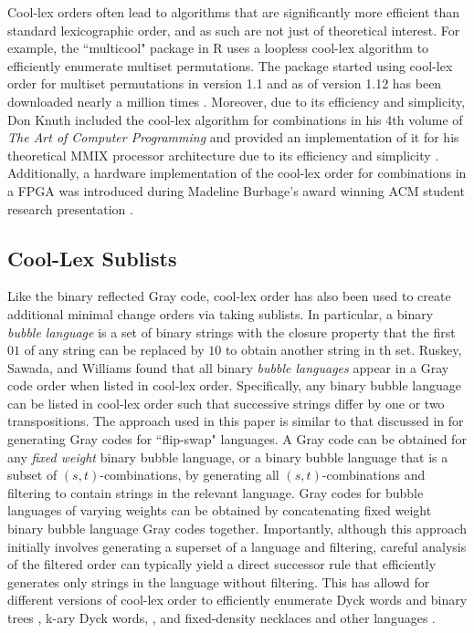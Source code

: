 Cool-lex orders often lead to algorithms that are significantly more efficient than standard lexicographic order, and as such are not just of theoretical interest.  For example, the ``multicool" package in R uses a loopless cool-lex algorithm to efficiently enumerate multiset permutations.   The package started using cool-lex order for multiset permutations in version 1.1 and as of version 1.12 has been downloaded nearly a million times \cite{multicool_2021}.  Moreover, due to its efficiency and simplicity, Don Knuth included the cool-lex algorithm for combinations in his 4th volume of \emph{The Art of Computer Programming} and provided an implementation of it for his theoretical MMIX processor architecture due to its efficiency and simplicity \cite{knuth2015art}.  Additionally, a hardware implementation of the cool-lex order for combinations in a FPGA was introduced during Madeline Burbage's award winning ACM student research presentation \cite{burbage2020cool}.





\subsection{Cool-Lex Sublists}

Like the binary reflected Gray code, cool-lex order has also been used to create additional minimal change orders via taking sublists. In particular, a binary \emph{bubble language} is a set of binary strings with the closure property that the first $01$ of any string can be replaced by $10$ to obtain another string in th set.  Ruskey, Sawada, and Williams found that all binary \emph{bubble languages} appear in a Gray code order when listed in cool-lex order.  Specifically, any binary bubble language can be listed in cool-lex order such that successive strings differ by one or two transpositions.  The approach used in this paper is similar to that discussed in \cite{sawada2021inside} for generating Gray codes for ``flip-swap" languages.  A Gray code can be obtained for any \emph{fixed weight} binary bubble language, or a binary bubble language that is a subset of $(s,t)$-combinations, by generating all $(s,t)$-combinations and filtering to contain strings in the relevant language.  Gray codes for bubble languages of varying weights can be obtained by concatenating fixed weight binary bubble language Gray codes together.
Importantly, although this approach initially involves generating a superset of a language and filtering, careful analysis of the filtered order can typically yield a direct successor rule that efficiently generates only strings in the language without filtering.  This has allowd for different versions of cool-lex order to efficiently enumerate Dyck words and binary trees \cite{ruskey2008generating}, k-ary Dyck words, \cite{durocher2012cool}, and fixed-density necklaces and other languages \cite{sawada2009fixed}.  

